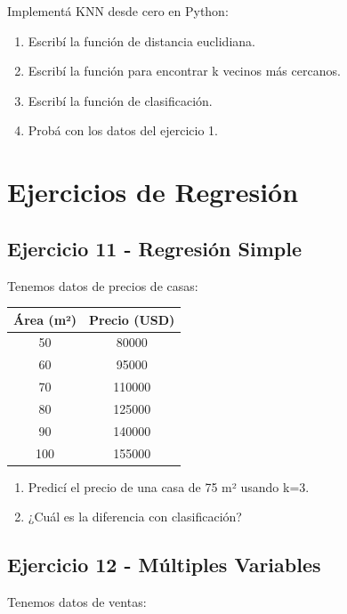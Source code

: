 \documentclass[12pt]{article}
\begin{document}
Implementá KNN desde cero en Python:

\begin{enumerate}
    \item Escribí la función de distancia euclidiana.
    \item Escribí la función para encontrar k vecinos más cercanos.
    \item Escribí la función de clasificación.
    \item Probá con los datos del ejercicio 1.
\end{enumerate}

\section{Ejercicios de Regresión}

\subsection{Ejercicio 11 - Regresión Simple}

Tenemos datos de precios de casas:

\begin{table}[H]
    \centering
    \begin{tabular}{cc}
        \toprule
        \textbf{Área (m²)} & \textbf{Precio (USD)} \\
        \midrule
        50 & 80000 \\
        60 & 95000 \\
        70 & 110000 \\
        80 & 125000 \\
        90 & 140000 \\
        100 & 155000 \\
        \bottomrule
    \end{tabular}
\end{table}

\begin{enumerate}
    \item Predicí el precio de una casa de 75 m² usando k=3.
    \item ¿Cuál es la diferencia con clasificación?
\end{enumerate}

\subsection{Ejercicio 12 - Múltiples Variables}

Tenemos datos de ventas:
\end{document}
